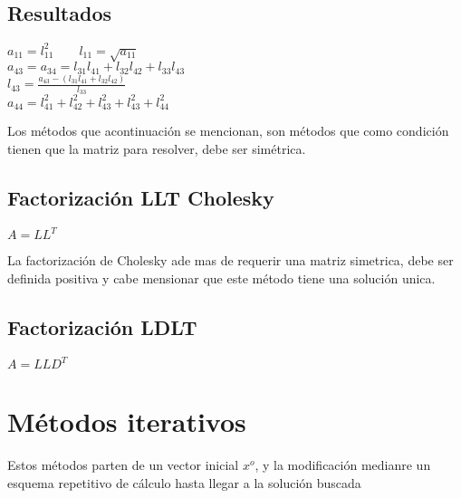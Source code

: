\subsection*{Resultados}
\begin{center}
$a_{11}=l_{11}^2 \qquad l_{11}=\sqrt{a_{11}}$\\
$a_{43}=a_{34}=l_{31}l_{41}+l_{32}l_{42}+l_{33}l_{43}$\\
$l_{43}=\frac{a_{43}-(l_{31}l_{41}+l_{32}l_{42})}{l_{33}}$ \\
$a_{44}=l_{41}^2+l_{42}^2+l_{43}^2+l_{43}^2+l_{44}^2$ \\
$ $ \\
\end{center}
Los m\'etodos que acontinuación se mencionan, son m\'etodos que como condici\'on tienen que la matriz para resolver, debe ser sim\'etrica.
\subsection{Factorizaci\'on LLT Cholesky}
\begin{center}
$ A=LL^T$
\end{center}
La factorizaci\'on de Cholesky ade mas de requerir una matriz simetrica, debe ser definida positiva y cabe mensionar que este m\'etodo tiene una soluci\'on unica.
\subsection{Factorizaci\'on LDLT}
\begin{center}
$ A=LLD^T $
\end{center}
\section{M\'etodos iterativos }
Estos m\'etodos parten de un vector inicial $x^o$, y la modificaci\'on medianre un esquema repetitivo de c\'alculo hasta llegar a la soluci\'on buscada
